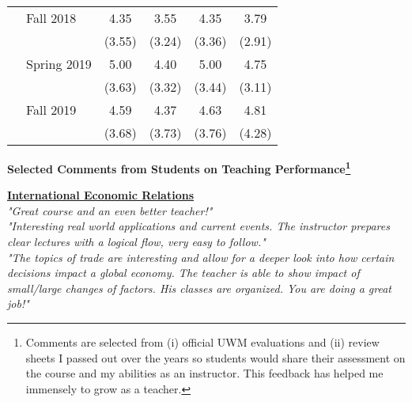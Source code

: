 \documentclass[a4paper,11pt]{article}
\begin{document}
\begin{table}[htbp]
{\begin{threeparttable}
\begin{tabular}{|l|l|c|c|c|c|}
& Fall 2018 & 4.35 & 3.55 & 4.35 & 3.79 \\
& & (3.55) & (3.24) & (3.36) & (2.91) \\

& Spring 2019 & 5.00 & 4.40 & 5.00 & 4.75 \\
& & (3.63) & (3.32) & (3.44) & (3.11) \\

& Fall 2019 & 4.59 & 4.37 & 4.63 & 4.81 \\
& & (3.68) & (3.73) & (3.76) & (4.28) \\
\hline 





\hline 
\end{tabular}
\end{threeparttable}
}
\end{table}


\newpage

\begin{center}
 \textbf{\large{Selected Comments from Students on Teaching Performance\footnote{Comments are selected from (i) official UWM evaluations and (ii) review sheets I passed out over the years so students would share their assessment on the course and my abilities as an instructor. This feedback has helped me immensely to grow as a teacher.}}}\\
 \end{center}
 
\medskip

\ul{\textbf{International Economic Relations}} \\

\textit{"Great course and an even better teacher!"} \\

\textit{"Interesting real world applications and current events. The instructor prepares clear lectures with a logical flow, very easy to follow."} \\

\textit{"The topics of trade are interesting and allow for a deeper look into how certain decisions impact a global economy. The teacher is able to show impact of small/large changes of factors. His classes are organized. You are doing a great job!"} \\
\end{document}
